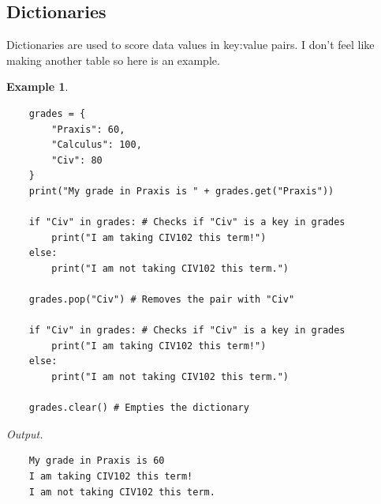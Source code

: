 \documentclass[11pt]{scrartcl}
\theoremstyle{definition}
\newtheorem*{example}{Example}
\begin{document}
\subsection{Dictionaries}

Dictionaries are used to score data values in key:value pairs. I don't feel like making another table so here is 
an example.

\begin{example}
    \
\begin{verbatim} 
    grades = {
        "Praxis": 60,
        "Calculus": 100,
        "Civ": 80
    }
    print("My grade in Praxis is " + grades.get("Praxis"))

    if "Civ" in grades: # Checks if "Civ" is a key in grades
        print("I am taking CIV102 this term!") 
    else:
        print("I am not taking CIV102 this term.")

    grades.pop("Civ") # Removes the pair with "Civ" 

    if "Civ" in grades: # Checks if "Civ" is a key in grades
        print("I am taking CIV102 this term!")
    else:
        print("I am not taking CIV102 this term.")

    grades.clear() # Empties the dictionary
\end{verbatim} 
    \textit{Output.}
\begin{verbatim}
    My grade in Praxis is 60
    I am taking CIV102 this term!
    I am not taking CIV102 this term.
\end{verbatim}
\end{example}
\end{document}
